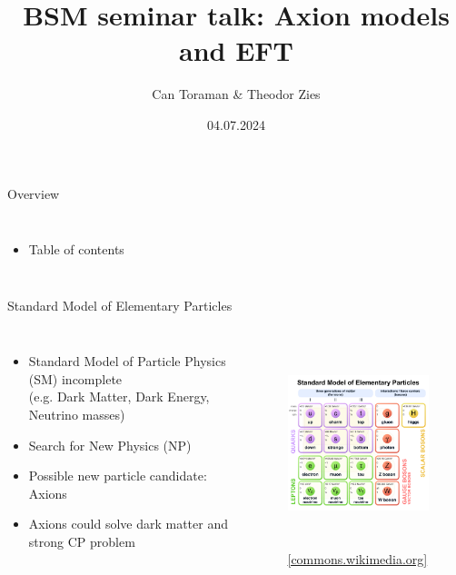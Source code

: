 \documentclass[aspectratio=1610, 9pt]{beamer}
\title{BSM seminar talk: Axion models and EFT}
\author{Can Toraman \& Theodor Zies}
\date{04.07.2024}
\institute[Department of physics]{Supervision: Prof. Dr. Gudrun Hiller}
\begin{document}
\begin{frame}
\titlepage
\end{frame}

\begin{frame}{Overview}
  \begin{columns}
    \column{\textwidth}
    \begin{itemize}
      \item Table of contents
    \end{itemize}
  \end{columns} 
\end{frame}

\begin{frame}{Standard Model of Elementary Particles}
  \begin{columns}
    \centering
    \begin{itemize}
      \item Standard Model of Particle Physics (SM) incomplete \\ (e.g. Dark Matter, Dark Energy, Neutrino masses)
      \item Search for New Physics (NP)
      \item Possible new particle candidate: Axions
      \item Axions could solve dark matter and strong CP problem
    \end{itemize}
    \begin{figure}
    \includegraphics[height=6cm]{images/SM.pdf}
    \caption{\footnotesize \href{https://commons.wikimedia.org/wiki/File:Standard_Model_of_Elementary_Particles.svg}{{[commons.wikimedia.org]}}}
    \end{figure}
  \end{columns} 
\end{frame}
\end{document}
